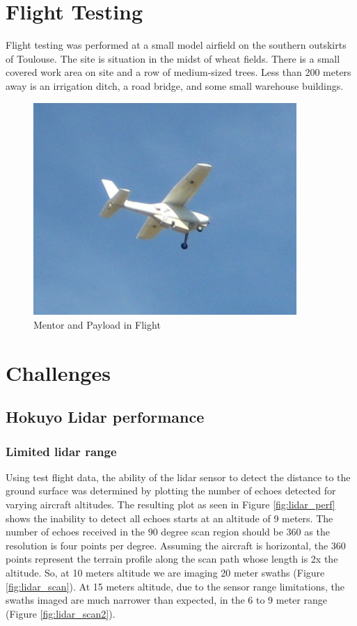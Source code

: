 \documentclass[a4paper,11pt]{report}
\begin{document}
\chapter{Flight Testing}
\label{flight_tests}

Flight testing was performed at a small model airfield on the southern outskirts of Toulouse. The site is situation in the midst of wheat fields. There is a small covered work area on site and a row of medium-sized trees. Less than 200 meters away is an irrigation ditch, a road bridge, and some small warehouse buildings.

\begin{figure}[ht]
 \centering
 \includegraphics[width=10cm]{mentor_in_flight.JPG}
 \caption{Mentor and Payload in Flight}
 \label{fig:mentor_flying}
\end{figure}


\chapter{Challenges}

\section{Hokuyo Lidar performance}

\subsection{Limited lidar range}

Using test flight data, the ability of the lidar sensor to detect the distance to the ground surface was determined by plotting the number of echoes detected for varying aircraft altitudes. The resulting plot as seen in Figure \ref{fig:lidar_perf} shows the inability to detect all echoes starts at an altitude of 9 meters. The number of echoes received in the 90 degree scan region should be 360 as the resolution is four points per degree. Assuming the aircraft is horizontal, the 360 points represent the terrain profile along the scan path whose length is 2x the altitude. So, at 10 meters altitude we are imaging 20 meter swaths (Figure \ref{fig:lidar_scan}). At 15 meters altitude, due to the sensor range limitations, the swaths imaged are much narrower than expected, in the 6 to 9 meter range (Figure \ref{fig:lidar_scan2}).
\end{document}
